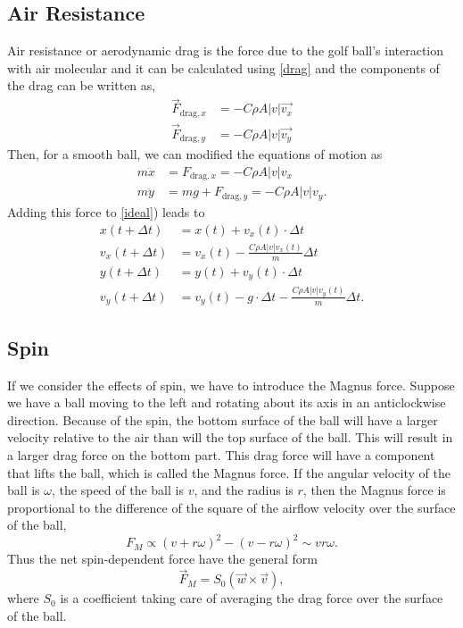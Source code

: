 \documentclass[a4paper]{article}
\begin{document}
	\subsection{Air Resistance}
	Air resistance or aerodynamic drag is the force due to the golf ball's interaction with air molecular and it can be calculated using \eqref{drag} and the components of the drag can be written  as,
	\begin{align}
		\vec{F}_{\textrm{drag}, x} &= - C\rho A |v|\vec{v_x}\\
		\vec{F}_{\textrm{drag}, y} &= - C\rho A |v|\vec{v_y}\nonumber 
	\end{align}
	Then, for a smooth ball, we can modified the equations of motion as
	\begin{align}
		m\ddot{x} &= F_{\textrm{drag}, x} = - C\rho A |v|v_x\\
		m\ddot{y} &= mg + F_{\textrm{drag}, y} = - C\rho A |v|v_y.\nonumber 
	\end{align}
	Adding this force to \eqref{ideal}) leads to
	\begin{align}
		x(t + \Delta t) &= x(t) + v_x(t)\cdot\Delta t \\
		v_x (t + \Delta t) &= v_x(t) - \frac{C\rho A |v|v_x(t)  \nonumber}{m}\Delta t \\
		y(t + \Delta t) &= y(t) + v_y(t)\cdot\Delta t \nonumber \\
		v_y(t + \Delta t) &= v_y(t) - g\cdot \Delta t - \frac{C\rho A |v|v_y(t)}{m}\Delta t.\nonumber 		
	\end{align}
	
	\subsection{Spin}
	If we consider the effects of spin, we have to introduce the Magnus force. Suppose we have a ball moving to the left and rotating about its axis in an anticlockwise direction. Because of the spin, the bottom surface of the ball will have a larger velocity relative to the air than will the top surface of the ball. This will result in a larger drag force on the bottom part. This drag force will have a component that lifts the ball, which is called the Magnus force. If the angular velocity of the ball is $\omega$, the speed of the ball is $v$, and the radius is $r$, then the Magnus force is proportional to the difference of the square of the airflow velocity over the surface of the ball, 
	\begin{equation}
		F_M \propto (v + r\omega)^2 - (v- r\omega)^2 \sim vr\omega.
	\end{equation} 
	Thus the net spin-dependent force have the general form
	\begin{equation}
		\vec{F}_M = S_0(\vec{w} \times \vec{v}),
	\end{equation}
	where $S_0$ is a coefficient taking care of averaging the drag force over the surface of the ball.
	
\end{document}
